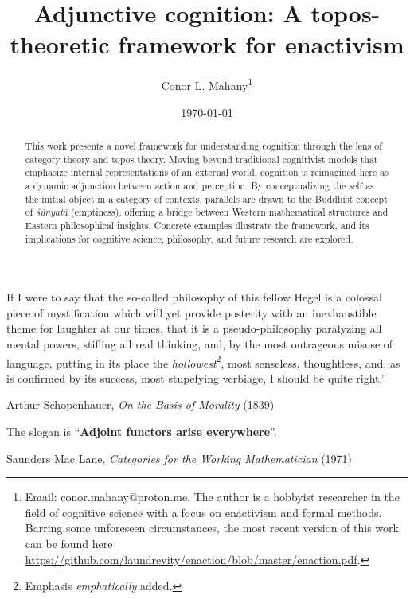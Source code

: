 \documentclass{article}
\title{Adjunctive cognition: A topos-theoretic framework for enactivism}
\author{Conor L. Mahany\footnote{
    Email: conor.mahany@proton.me. The author is a hobbyist researcher in the field of cognitive science with a focus on enactivism and formal methods. Barring some unforeseen circumstances, the most recent version of this work can be found here \href{https://github.com/laundrevity/enaction/blob/master/enaction.pdf}{https://github.com/laundrevity/enaction/blob/master/enaction.pdf}.
}}
\date{\today}
\begin{document}
\maketitle

\begin{abstract}
    This work presents a novel framework for understanding cognition through the lens of category theory and topos theory. Moving beyond traditional cognitivist models that emphasize internal representations of an external world, cognition is reimagined here as a dynamic adjunction between action and perception. By conceptualizing the self as the initial object in a category of contexts, parallels are drawn to the Buddhist concept of \emph{śūnyatā} (emptiness), offering a bridge between Western mathematical structures and Eastern philosophical insights. Concrete examples illustrate the framework, and its implications for cognitive science, philosophy, and future research are explored.
\end{abstract}

\newpage

\begin{customquote}
    If I were to say that the so-called philosophy of this fellow Hegel is a colossal piece of mystification which will yet provide posterity with an inexhaustible theme for laughter at our times, that it is a pseudo-philosophy paralyzing all mental powers, stifling all real thinking, and, by the most outrageous misuse of language, putting in its place the \emph{hollowest}\footnote{Emphasis \emph{emphatically} added.}, most senseless, thoughtless, and, as is confirmed by its success, most stupefying verbiage, I should be quite right.” \\
    \begin{center}
        Arthur Schopenhauer, \emph{On the Basis of Morality} (1839)
    \end{center}
\end{customquote}

\vspace{10px} %

\begin{customquote}
    The slogan is ``\textbf{Adjoint functors arise everywhere}''. \\
    \begin{center}
        Saunders Mac Lane, \emph{Categories for the Working Mathematician} (1971)
    \end{center}
\end{customquote}
\end{document}
